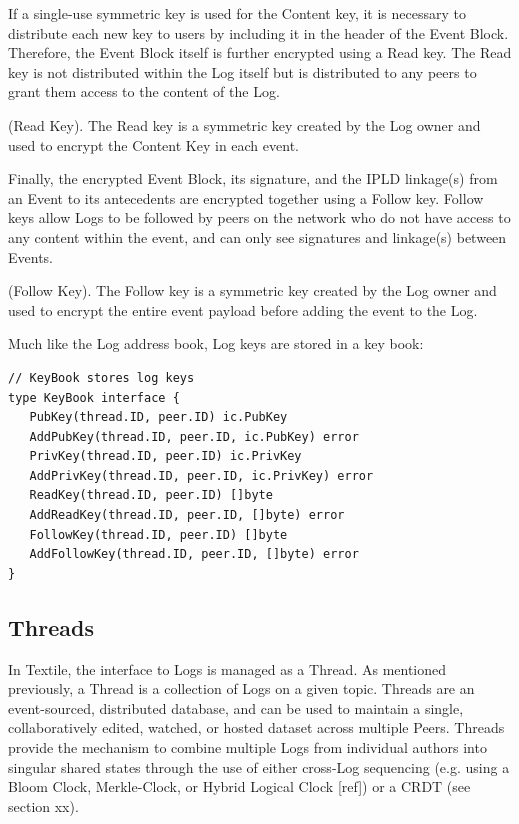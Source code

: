 \documentclass{comjnl}
\begin{document}
If a single-use symmetric key is used for the Content key, it is necessary to distribute each new key to users by including it in the header of the Event Block. Therefore, the Event Block itself is further encrypted using a Read key. The Read key is not distributed within the Log itself but is distributed to any peers to grant them access to the content of the Log. 

\begin{definition}
 (Read Key). The Read key is a symmetric key created by the Log owner and used to encrypt the Content Key in each event.
\end{definition}

Finally, the encrypted Event Block, its signature, and the IPLD linkage(s) from an Event to its antecedents are encrypted together using a Follow key. Follow keys allow Logs to be followed by peers on the network who do not have access to any content within the event, and can only see signatures and linkage(s) between Events.

\begin{definition}
(Follow Key). The Follow key is a symmetric key created by the Log owner and used to encrypt the entire event payload before adding the event to the Log.
\end{definition}

Much like the Log address book, Log keys are stored in a key book:

\begin{lstlisting}
// KeyBook stores log keys
type KeyBook interface {
   PubKey(thread.ID, peer.ID) ic.PubKey
   AddPubKey(thread.ID, peer.ID, ic.PubKey) error
   PrivKey(thread.ID, peer.ID) ic.PrivKey
   AddPrivKey(thread.ID, peer.ID, ic.PrivKey) error
   ReadKey(thread.ID, peer.ID) []byte
   AddReadKey(thread.ID, peer.ID, []byte) error
   FollowKey(thread.ID, peer.ID) []byte
   AddFollowKey(thread.ID, peer.ID, []byte) error
}
\end{lstlisting}

\subsection{Threads}

In Textile, the interface to Logs is managed as a Thread. As mentioned previously, a Thread is a collection of Logs on a given topic. Threads are an event-sourced, distributed database, and can be used to maintain a single, collaboratively edited, watched, or hosted dataset across multiple Peers. Threads provide the mechanism to combine multiple Logs from individual authors into singular shared states through the use of either cross-Log sequencing (e.g. using a Bloom Clock, Merkle-Clock, or Hybrid Logical Clock [ref]) or a CRDT (see section xx).
\end{document}
